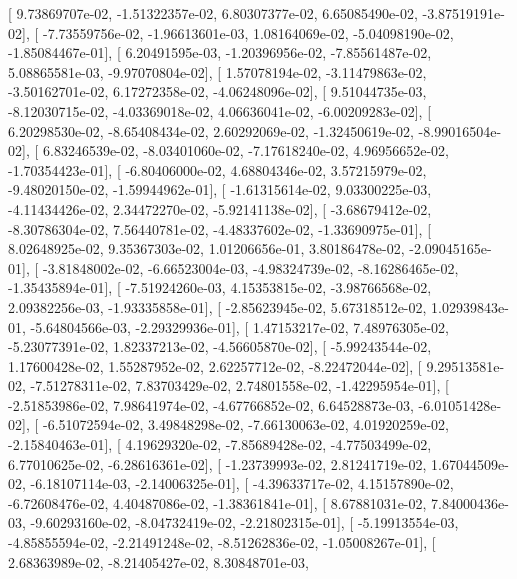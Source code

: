 \documentclass{article}
\begin{document}
       [  9.73869707e-02,  -1.51322357e-02,   6.80307377e-02,
          6.65085490e-02,  -3.87519191e-02],
       [ -7.73559756e-02,  -1.96613601e-03,   1.08164069e-02,
         -5.04098190e-02,  -1.85084467e-01],
       [  6.20491595e-03,  -1.20396956e-02,  -7.85561487e-02,
          5.08865581e-03,  -9.97070804e-02],
       [  1.57078194e-02,  -3.11479863e-02,  -3.50162701e-02,
          6.17272358e-02,  -4.06248096e-02],
       [  9.51044735e-03,  -8.12030715e-02,  -4.03369018e-02,
          4.06636041e-02,  -6.00209283e-02],
       [  6.20298530e-02,  -8.65408434e-02,   2.60292069e-02,
         -1.32450619e-02,  -8.99016504e-02],
       [  6.83246539e-02,  -8.03401060e-02,  -7.17618240e-02,
          4.96956652e-02,  -1.70354423e-01],
       [ -6.80406000e-02,   4.68804346e-02,   3.57215979e-02,
         -9.48020150e-02,  -1.59944962e-01],
       [ -1.61315614e-02,   9.03300225e-03,  -4.11434426e-02,
          2.34472270e-02,  -5.92141138e-02],
       [ -3.68679412e-02,  -8.30786304e-02,   7.56440781e-02,
         -4.48337602e-02,  -1.33690975e-01],
       [  8.02648925e-02,   9.35367303e-02,   1.01206656e-01,
          3.80186478e-02,  -2.09045165e-01],
       [ -3.81848002e-02,  -6.66523004e-03,  -4.98324739e-02,
         -8.16286465e-02,  -1.35435894e-01],
       [ -7.51924260e-03,   4.15353815e-02,  -3.98766568e-02,
          2.09382256e-03,  -1.93335858e-01],
       [ -2.85623945e-02,   5.67318512e-02,   1.02939843e-01,
         -5.64804566e-03,  -2.29329936e-01],
       [  1.47153217e-02,   7.48976305e-02,  -5.23077391e-02,
          1.82337213e-02,  -4.56605870e-02],
       [ -5.99243544e-02,   1.17600428e-02,   1.55287952e-02,
          2.62257712e-02,  -8.22472044e-02],
       [  9.29513581e-02,  -7.51278311e-02,   7.83703429e-02,
          2.74801558e-02,  -1.42295954e-01],
       [ -2.51853986e-02,   7.98641974e-02,  -4.67766852e-02,
          6.64528873e-03,  -6.01051428e-02],
       [ -6.51072594e-02,   3.49848298e-02,  -7.66130063e-02,
          4.01920259e-02,  -2.15840463e-01],
       [  4.19629320e-02,  -7.85689428e-02,  -4.77503499e-02,
          6.77010625e-02,  -6.28616361e-02],
       [ -1.23739993e-02,   2.81241719e-02,   1.67044509e-02,
         -6.18107114e-03,  -2.14006325e-01],
       [ -4.39633717e-02,   4.15157890e-02,  -6.72608476e-02,
          4.40487086e-02,  -1.38361841e-01],
       [  8.67881031e-02,   7.84000436e-03,  -9.60293160e-02,
         -8.04732419e-02,  -2.21802315e-01],
       [ -5.19913554e-03,  -4.85855594e-02,  -2.21491248e-02,
         -8.51262836e-02,  -1.05008267e-01],
       [  2.68363989e-02,  -8.21405427e-02,   8.30848701e-03,
\end{document}
